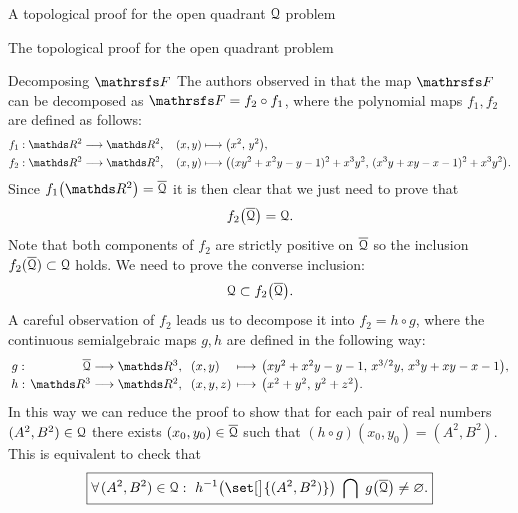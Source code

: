 \documentclass[11pt, a4paper, english, twoside, notitlepage, openright]{report}
\begin{document}
\begin{chapter}{A topological proof for the open quadrant $\mathcal{Q}$ problem}
\begin{section}{The topological proof for the open quadrant problem}
\begin{subsection}{Decomposing $\FFF$}
The authors observed in \cite[Section 3]{fgu} that the map $\FFF$ can be decomposed as $\FFF=f_2\circ f_1$, where the polynomial maps $f_1, f_2$ are defined as follows:
\begin{align*}
&f_1:\R^2\longrightarrow\R^2,\quad (x,y)\longmapsto\big(x^2,\,y^2\big),\\
&f_2:\R^2\longrightarrow\R^2,\quad (x,y)\longmapsto\big((xy^2+x^2y-y-1)^2+x^3y^2,\,(x^3y+xy-x-1)^2+x^3y^2\big).
\end{align*}
Since $f_1\big(\R^2\big)=\overline{\Qu}$ it is then clear that we just need to prove that
\begin{equation}
f_2\big(\overline{\mathcal{Q}}\big)=\mathcal{Q}.
\end{equation}
Note that both components of $f_2$ are strictly positive on $\overline{\mathcal{Q}}$ so the inclusion $f_2(\overline{\mathcal{Q}})\subset\mathcal{Q}$ holds. We need to prove the converse inclusion:
\begin{equation}\label{mainTop}
\mathcal{Q}\subset f_2\big(\overline{\mathcal{Q}}\big).
\end{equation}
A careful observation of $f_2$ leads us to decompose it into $f_2=h\circ g$, where the continuous semialgebraic maps $g, h$ are defined in the following way:
$$
\arraycolsep=2pt\def\arraystretch{1.2}
\begin{array}{crlcl}
g:&\overline{\Qu}\longrightarrow\R^3,&\ (x,y)&\longmapsto&\big(xy^2+x^2y-y-1,\,x^{3/2}y,\,x^3y+xy-x-1\big),\\
h:&\R^3\longrightarrow\R^2,&\ (x,y,z)&\longmapsto&\big(x^2+y^2,\,y^2+z^2\big).\\
\end{array}
$$
In this way we can reduce the proof to show that for each pair of real numbers $(A^2,B^2)\in\mathcal{Q}$ there exists $(x_0,y_0)\in\overline{\mathcal{Q}}$ such that $(h\circ g)(x_0,y_0)=(A^2,B^2)$. This is equivalent to check that
\begin{equation*}
\boxed{
\forall (A^2,B^2)\in\Qu:\ h^{-1}\big(\set[\big]{(A^2,B^2)}\big)\ \bigcap\ g\big(\overline{\Qu}\big)\ne\varnothing.
}
\end{equation*}


\end{subsection}
\end{section}
\end{chapter}
\end{document}
